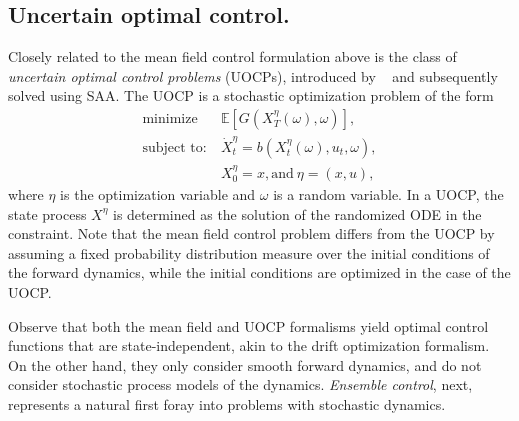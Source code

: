 \documentclass[11pt,leqno]{amsart}
\begin{document}
\subsection{Uncertain optimal control.} Closely related to the mean field control formulation above is the class of {\it uncertain optimal control problems} (UOCPs), introduced by ~\cite{PHELPS20142987,Phelps_2016} and subsequently solved using SAA. The UOCP is a stochastic optimization problem of the form
\begin{align*}
	\text{minimize} &~\mathbb E[G(X^\eta_T(\omega),\omega)],\\
	\text{subject to:} &~\dot{X}^\eta_t = b(X^\eta_t(\omega),u_t,\omega),\\&~X_0^\eta = x,\text{and}~\eta=(x,u),
\end{align*}
where $\eta$ is the optimization variable and $\omega$ is a random variable. In a UOCP, the state process $X^\eta$ is determined as the solution of the randomized ODE in the constraint. Note that the mean field control problem differs from the UOCP by assuming a fixed probability distribution measure over the initial conditions of the forward dynamics, while the initial conditions are optimized in the case of the UOCP. 

Observe that both the mean field and UOCP formalisms yield optimal control functions that are state-independent, akin to the drift optimization formalism. On the other hand, they only consider smooth forward dynamics, and do not consider stochastic process models of the dynamics.  {\it Ensemble control}, next, represents a natural first foray into problems with stochastic dynamics.

\end{document}
